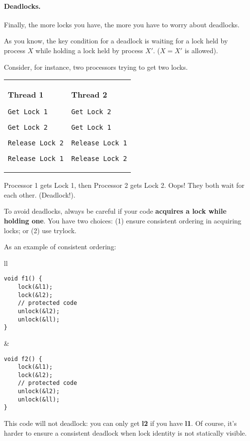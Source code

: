 \paragraph{Deadlocks.} Finally, the more locks you have, the more you have to worry about deadlocks.

As you know, the key condition for a deadlock is waiting for a lock held by process $X$ while holding
a lock held by process $X'$. ($X = X'$ is allowed).


Consider, for instance, two processors trying to get two locks.

\begin{center}
  \begin{tabular}{ll}
\begin{minipage}{.4\textwidth}
      {\bf Thread 1}

      \verb+Get Lock 1+

      \verb+Get Lock 2+

      \verb+Release Lock 2+

      \verb+Release Lock 1+
\end{minipage} & 
\begin{minipage}{.4\textwidth}
      {\bf Thread 2}

      \verb+Get Lock 2+

      \verb+Get Lock 1+

      \verb+Release Lock 1+

      \verb+Release Lock 2+
\end{minipage}
\end{tabular}
\end{center}

 Processor 1 gets Lock 1, then Processor 2 gets Lock 2. Oops! They
 both wait for each other. (Deadlock!).

To avoid deadlocks, always be careful if your code {\bf acquires a
  lock while holding one}.  You have two choices: (1) ensure
consistent ordering in acquiring locks; or (2) use trylock.

As an example of consistent ordering:
\begin{center}
\begin{tabular}{ll}
\begin{minipage}{.4\textwidth}
  \begin{verbatim}
void f1() {
    lock(&l1);
    lock(&l2);
    // protected code
    unlock(&l2);
    unlock(&ll);    
}
\end{verbatim}
\end{minipage}&
\begin{minipage}{.4\textwidth}
\begin{verbatim}
void f2() {
    lock(&l1);
    lock(&l2);
    // protected code
    unlock(&l2);
    unlock(&ll);    
}
  \end{verbatim}
\end{minipage}
\end{tabular}
\end{center}
This code will not deadlock: you can only get {\bf l2} if you have
{\bf l1}. Of course, it's harder to ensure a consistent deadlock when lock
identity is not statically visible.

